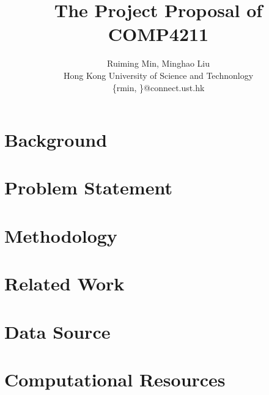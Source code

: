 \documentclass{article}
\title{The Project Proposal of COMP4211}
\author{
    Ruiming Min, Minghao Liu\\
    Hong Kong University of Science and Technonlogy \\
    {\{rmin, \}@connect.ust.hk}
}
\begin{document}
\maketitle

\section{Background}

\section{Problem Statement}

\section{Methodology}

\section{Related Work}

\section{Data Source}

\section{Computational Resources}



% 
% 
\end{document}
